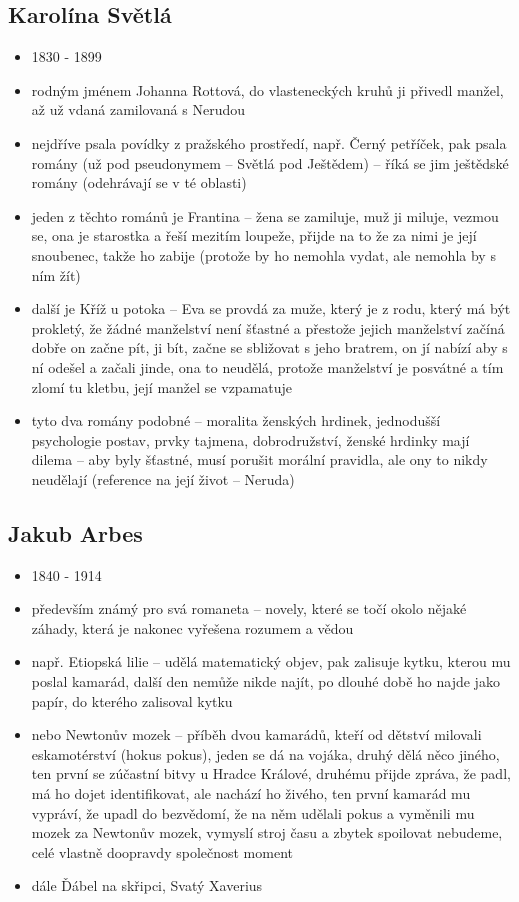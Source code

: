 \documentclass{article}
\begin{document}
\subsection{Karolína Světlá}
\begin{itemize}
  \item 1830 - 1899
  \item rodným jménem Johanna Rottová, do vlasteneckých kruhů ji přivedl manžel, až už vdaná zamilovaná s Nerudou
  \item nejdříve psala povídky z pražského prostředí, např. Černý petříček, pak psala romány (už pod pseudonymem -- Světlá pod Ještědem) -- říká se jim ještědské romány (odehrávají se v té oblasti)
  \item jeden z těchto románů je Frantina -- žena se zamiluje, muž ji miluje, vezmou se, ona je starostka a řeší mezitím loupeže, přijde na to že za nimi je její snoubenec, takže ho zabije (protože by ho nemohla vydat, ale nemohla by s ním žít)
  \item další je Kříž u potoka -- Eva se provdá za muže, který je z rodu, který má být prokletý, že žádné manželství není šťastné a přestože jejich manželství začíná dobře on začne pít, ji bít, začne se sbližovat s jeho bratrem, on jí nabízí aby s ní odešel a začali jinde, ona to neudělá, protože manželství je posvátné a tím zlomí tu kletbu, její manžel se vzpamatuje
  \item tyto dva romány podobné -- moralita ženských hrdinek, jednodušší psychologie postav, prvky tajmena, dobrodružství, ženské hrdinky mají dilema -- aby byly šťastné, musí porušit morální pravidla, ale ony to nikdy neudělají (reference na její život -- Neruda)
\end{itemize}

\subsection{Jakub Arbes}
\begin{itemize}
  \item 1840 - 1914
  \item především známý pro svá romaneta -- novely, které se točí okolo nějaké záhady, která je nakonec vyřešena rozumem a vědou
  \item např. Etiopská lilie -- udělá matematický objev, pak zalisuje kytku, kterou mu poslal kamarád, další den nemůže nikde najít, po dlouhé době ho najde jako papír, do kterého zalisoval kytku
  \item nebo Newtonův mozek -- příběh dvou kamarádů, kteří od dětství milovali eskamotérství (hokus pokus), jeden se dá na vojáka, druhý dělá něco jiného, ten první se zúčastní bitvy u Hradce Králové, druhému přijde zpráva, že padl, má ho dojet identifikovat, ale nachází ho živého, ten první kamarád mu vypráví, že upadl do bezvědomí, že na něm udělali pokus a vyměnili mu mozek za Newtonův mozek, vymyslí stroj času a zbytek spoilovat nebudeme, celé vlastně doopravdy společnost moment
  \item dále Ďábel na skřipci, Svatý Xaverius
\end{itemize}
\end{document}

